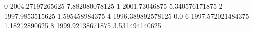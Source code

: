 0 2004.27197265625 7.882080078125
1 2001.73046875 5.340576171875
2 1997.9853515625 1.595458984375
4 1996.389892578125 0.0
6 1997.572021484375 1.18212890625
8 1999.92138671875 3.531494140625
